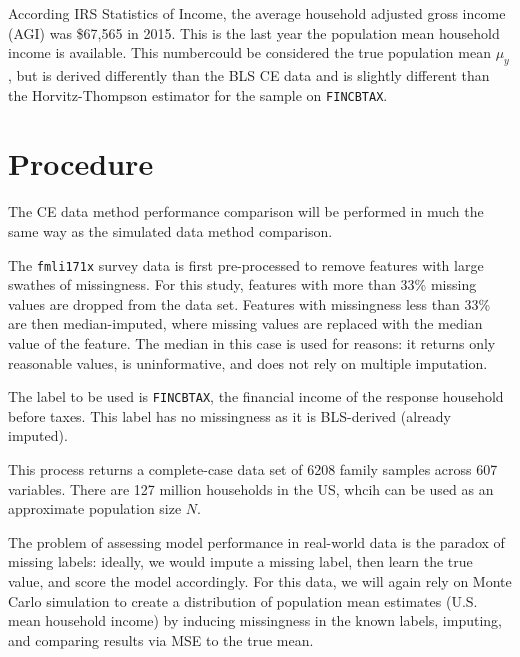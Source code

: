\documentclass[12pt,twoside]{reedthesis}
\begin{document}
According IRS Statistics of Income, the average household adjusted gross
income (AGI) was \$67,565 in 2015. This is the last year the population
mean household income is available. This numbercould be considered the
true population mean \(\mu_y\), but is derived differently than the BLS
CE data and is slightly different than the Horvitz-Thompson estimator
for the sample on \texttt{FINCBTAX}.

\section{Procedure}\label{procedure}

The CE data method performance comparison will be performed in much the
same way as the simulated data method comparison.

The \texttt{fmli171x} survey data is first pre-processed to remove
features with large swathes of missingness. For this study, features
with more than 33\% missing values are dropped from the data set.
Features with missingness less than 33\% are then median-imputed, where
missing values are replaced with the median value of the feature. The
median in this case is used for reasons: it returns only reasonable
values, is uninformative, and does not rely on multiple imputation.

The label to be used is \texttt{FINCBTAX}, the financial income of the
response household before taxes. This label has no missingness as it is
BLS-derived (already imputed).

This process returns a complete-case data set of 6208 family samples
across 607 variables. There are 127 million households in the US, whcih
can be used as an approximate population size \(N\).

The problem of assessing model performance in real-world data is the
paradox of missing labels: ideally, we would impute a missing label,
then learn the true value, and score the model accordingly. For this
data, we will again rely on Monte Carlo simulation to create a
distribution of population mean estimates (U.S. mean household income)
by inducing missingness in the known labels, imputing, and comparing
results via MSE to the true mean.
\end{document}
